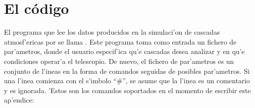 

\section{El c\'odigo }
\label{sec:reflector}
%
El programa que lee los datos producidos en la simulaci'on de cascadas
atmosf'ericas por \CORSIKA se llama .  Este programa toma
como entrada un fichero de par'ametros, donde el usuario especif'ica
qu'e cascadas desea analizar y en qu'e condiciones operar'a el
telescopio.  De nuevo, el fichero de par'ametros es un conjunto de
l'ineas en la forma de comandos seguidas de posibles par'ametros.  Si
una l'inea comienza con el s'imbolo ``\#'', se asume que la l'inea es
un comentario y es ignorada.  'Estos son los comandos soportados en el
momento de escribir este ap'endice:


